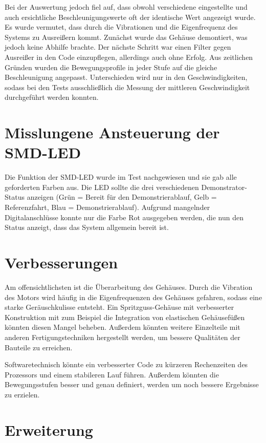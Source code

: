 Bei der Auswertung jedoch fiel auf, dass obwohl verschiedene eingestellte und auch ersichtliche Beschleunigungswerte oft der identische Wert angezeigt wurde. Es wurde vermutet, dass durch die Vibrationen und die Eigenfrequenz des Systems zu Ausreißern kommt. Zunächst wurde das Gehäuse demontiert, was jedoch keine Abhilfe brachte. Der nächste Schritt war einen Filter gegen Ausreißer in den Code einzupflegen, allerdings auch ohne Erfolg. 
Aus zeitlichen Gründen wurden die Bewegungsprofile in jeder Stufe auf die gleiche Beschleunigung angepasst. Unterschieden wird nur in den Geschwindigkeiten, sodass bei den Tests ausschließlich die Messung der mittleren Geschwindigkeit durchgeführt werden konnten.    

\section{Misslungene Ansteuerung der SMD-LED}

Die Funktion der SMD-LED wurde im Test nachgewiesen und sie gab alle geforderten Farben aus. Die LED sollte die drei verschiedenen Demonstrator-Status anzeigen (Grün = Bereit für den Demonstrierablauf, Gelb = Referenzfahrt, Blau = Demonstrierablauf). Aufgrund mangelnder Digitalanschlüsse konnte nur die Farbe Rot ausgegeben werden, die nun den Status anzeigt, dass das System allgemein bereit ist.  

\section{Verbesserungen}

Am offensichtlichsten ist die Überarbeitung des Gehäuses. Durch die Vibration des Motors wird häufig in die Eigenfrequenzen des Gehäuses gefahren, sodass eine starke Geräuschkulisse entsteht. Ein Spritzguss-Gehäuse mit verbesserter Konstruktion mit zum Beispiel die Integration von elastischen Gehäusefüßen könnten diesen Mangel beheben. Außerdem könnten weitere Einzelteile mit anderen Fertigungstechniken hergestellt werden, um bessere Qualitäten der Bauteile zu erreichen.

Softwaretechnisch könnte ein verbesserter Code zu kürzeren Rechenzeiten des Prozessors und einem stabileren Lauf führen. Außerdem könnten die Bewegungsstufen besser und genau definiert, werden um noch bessere Ergebnisse zu erzielen.   


\section{Erweiterung}

